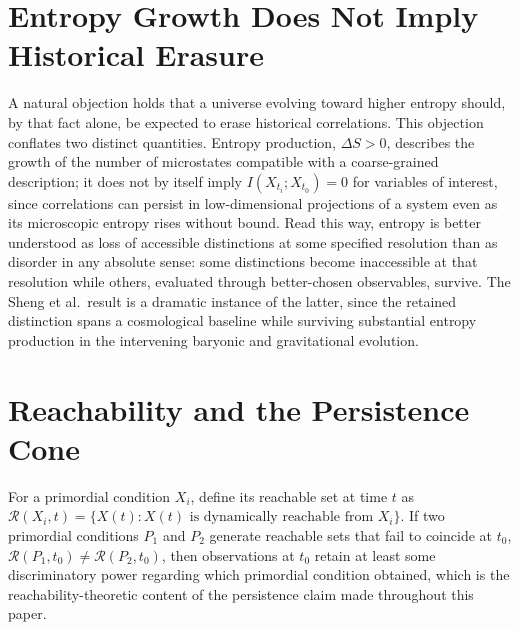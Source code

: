\documentclass[11pt]{article}
\begin{document}
\section{Entropy Growth Does Not Imply Historical Erasure}

A natural objection holds that a universe evolving toward higher entropy should, by that fact alone, be expected to erase historical correlations. This objection conflates two distinct quantities. Entropy production, $\Delta S > 0$, describes the growth of the number of microstates compatible with a coarse-grained description; it does not by itself imply $I(X_{t_i}; X_{t_0}) = 0$ for variables of interest, since correlations can persist in low-dimensional projections of a system even as its microscopic entropy rises without bound. Read this way, entropy is better understood as loss of accessible distinctions at some specified resolution than as disorder in any absolute sense: some distinctions become inaccessible at that resolution while others, evaluated through better-chosen observables, survive. The Sheng et al.\ result is a dramatic instance of the latter, since the retained distinction spans a cosmological baseline while surviving substantial entropy production in the intervening baryonic and gravitational evolution.

\section{Reachability and the Persistence Cone}

For a primordial condition $X_i$, define its reachable set at time $t$ as $\mathcal R(X_i, t) = \{X(t) : X(t) \text{ is dynamically reachable from } X_i\}$. If two primordial conditions $P_1$ and $P_2$ generate reachable sets that fail to coincide at $t_0$, $\mathcal R(P_1, t_0) \neq \mathcal R(P_2, t_0)$, then observations at $t_0$ retain at least some discriminatory power regarding which primordial condition obtained, which is the reachability-theoretic content of the persistence claim made throughout this paper.
\end{document}
